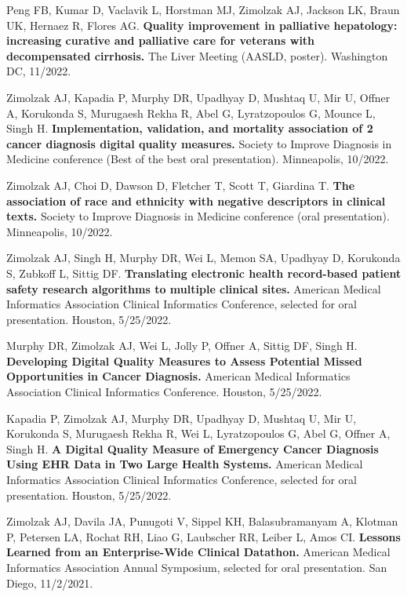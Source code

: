 \documentclass[10pt]{article}
\begin{document}
Peng FB, Kumar D, Vaclavik L, Horstman MJ, Zimolzak AJ, Jackson LK,
Braun UK, Hernaez R, Flores AG. \textbf{Quality improvement in
  palliative hepatology: increasing curative and palliative care for
  veterans with decompensated cirrhosis.} The Liver Meeting (AASLD,
poster). Washington DC, 11/2022.

Zimolzak AJ, Kapadia P, Murphy DR, Upadhyay D, Mushtaq U, Mir U,
Offner A, Korukonda S, Murugaesh Rekha R, Abel G, Lyratzopoulos G,
Mounce L, Singh H. \textbf{Implementation, validation, and mortality
  association of 2 cancer diagnosis digital quality measures.} Society
to Improve Diagnosis in Medicine conference (Best of the best oral
presentation). Minneapolis, 10/2022.

Zimolzak AJ, Choi D, Dawson D, Fletcher T, Scott T, Giardina T.
\textbf{The association of race and ethnicity with negative
  descriptors in clinical texts.} Society to Improve Diagnosis in
Medicine conference (oral presentation). Minneapolis, 10/2022.



Zimolzak AJ, Singh H, Murphy DR, Wei L, Memon SA, Upadhyay D,
Korukonda S, Zubkoff L, Sittig DF. \textbf{Translating electronic
  health record-based patient safety research algorithms to multiple
  clinical sites.} American Medical Informatics Association Clinical
Informatics Conference, selected for oral presentation. Houston,
5/25/2022.

Murphy DR, Zimolzak AJ, Wei L, Jolly P, Offner A, Sittig DF, Singh H.
\textbf{Developing Digital Quality Measures to Assess Potential Missed
  Opportunities in Cancer Diagnosis.} American Medical Informatics
Association Clinical Informatics Conference. Houston, 5/25/2022.

Kapadia P, Zimolzak AJ, Murphy DR, Upadhyay D, Mushtaq U, Mir U,
Korukonda S, Murugaesh Rekha R, Wei L, Lyratzopoulos G, Abel G, Offner
A, Singh H. \textbf{A Digital Quality Measure of Emergency Cancer
  Diagnosis Using EHR Data in Two Large Health Systems.} American
Medical Informatics Association Clinical Informatics Conference,
selected for oral presentation. Houston, 5/25/2022.



Zimolzak AJ, Davila JA, Punugoti V, Sippel KH, Balasubramanyam A,
Klotman P, Petersen LA, Rochat RH, Liao G, Laubscher RR, Leiber L,
Amos CI. \textbf{Lessons Learned from an Enterprise-Wide Clinical
  Datathon.} American Medical Informatics Association Annual
Symposium, selected for oral presentation. San Diego, 11/2/2021.
\end{document}
